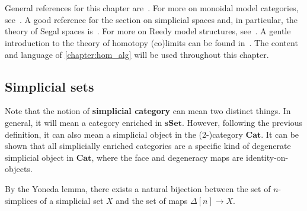 \chapter{}\label{chapter:model_theory}

    General references for this chapter are~\citet{hovey_model_2007,riehl_homotopical_2019}. For more on monoidal model categories, see~\citet{riehl_monoidal_2013}. A good reference for the section on simplicial spaces and, in particular, the theory of Segal spaces is~\citet{rezk_model_2001}. For more on Reedy model structures, see~\citet{riehl_theory_2013}. A gentle introduction to the theory of homotopy (co)limits can be found in~\citet{riehl_homotopy_2011,lambrechts_gentle_2013}. The content and language of \cref{chapter:hom_alg} will be used throughout this chapter.

\section{Simplicial sets}

    \begin{remark}
        Note that the notion of \textbf{simplicial category} can mean two distinct things. In general, it will mean a category enriched in $\mathbf{sSet}$. However, following the previous definition, it can also mean a simplicial object in the (2-)category $\mathbf{Cat}$. It can be shown that all simplicially enriched categories are a specific kind of degenerate simplicial object in $\mathbf{Cat}$, where the face and degeneracy maps are identity-on-objects.
    \end{remark}

    \begin{property}
        By the Yoneda lemma, there exists a natural bijection between the set of $n$-simplices of a simplicial set $X$ and the set of maps $\Delta[n]\rightarrow X$.
    \end{property}

